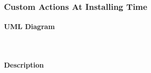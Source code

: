 \subsubsection{Custom Actions At Installing Time}

\paragraph{UML Diagram}

\begin{center}
\end{center}\

\paragraph{Description}

